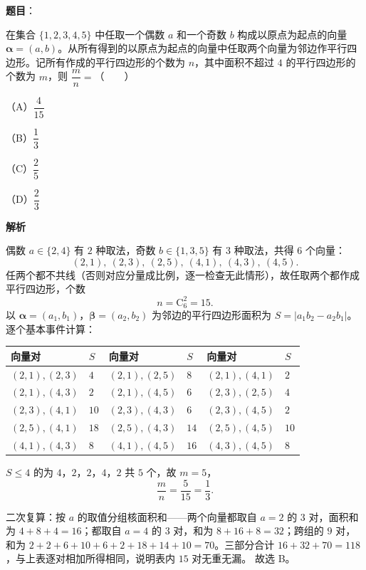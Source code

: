 \begin{answer}

\textbf{题目}：

在集合 $\{1,2,3,4,5\}$ 中任取一个偶数 $a$ 和一个奇数 $b$ 构成以原点为起点的向量 $\boldsymbol\alpha=(a,b)$。从所有得到的以原点为起点的向量中任取两个向量为邻边作平行四边形。记所有作成的平行四边形的个数为 $n$，其中面积不超过 $4$ 的平行四边形的个数为 $m$，则 $\dfrac{m}{n}=$\mbox{（　　）}

（A）$\dfrac{4}{15}$

（B）$\dfrac13$

（C）$\dfrac25$

（D）$\dfrac23$

\textbf{解析}

偶数 $a\in\{2,4\}$ 有 $2$ 种取法，奇数 $b\in\{1,3,5\}$ 有 $3$ 种取法，共得 $6$ 个向量：
\nopagebreak[4]
\[(2,1),\ (2,3),\ (2,5),\ (4,1),\ (4,3),\ (4,5).\]
任两个都不共线（否则对应分量成比例，逐一检查无此情形），故任取两个都作成平行四边形，个数
\nopagebreak[4]
\[n=\mathrm C_6^2=15.\]
以 $\boldsymbol\alpha=(a_1,b_1)$，$\boldsymbol\beta=(a_2,b_2)$ 为邻边的平行四边形面积为 $S=|a_1b_2-a_2b_1|$。逐个基本事件计算：

\begin{center}
\begin{tabular}{llllll}
\toprule
向量对 & $S$ & 向量对 & $S$ & 向量对 & $S$ \\
\midrule
$(2,1),(2,3)$ & $4$ & $(2,1),(2,5)$ & $8$ & $(2,1),(4,1)$ & $2$ \\
$(2,1),(4,3)$ & $2$ & $(2,1),(4,5)$ & $6$ & $(2,3),(2,5)$ & $4$ \\
$(2,3),(4,1)$ & $10$ & $(2,3),(4,3)$ & $6$ & $(2,3),(4,5)$ & $2$ \\
$(2,5),(4,1)$ & $18$ & $(2,5),(4,3)$ & $14$ & $(2,5),(4,5)$ & $10$ \\
$(4,1),(4,3)$ & $8$ & $(4,1),(4,5)$ & $16$ & $(4,3),(4,5)$ & $8$ \\
\bottomrule
\end{tabular}
\end{center}

$S\leqslant4$ 的为 $4$，$2$，$2$，$4$，$2$ 共 $5$ 个，故 $m=5$，
\nopagebreak[4]
\[\frac mn=\frac{5}{15}=\frac13.\]

二次复算：按 $a$ 的取值分组核面积和——两个向量都取自 $a=2$ 的 $3$ 对，面积和为 $4+8+4=16$；都取自 $a=4$ 的 $3$ 对，和为 $8+16+8=32$；跨组的 $9$ 对，和为 $2+2+6+10+6+2+18+14+10=70$。三部分合计 $16+32+70=118$，与上表逐对相加所得相同，说明表内 $15$ 对无重无漏。
故选 B。


\end{answer}

